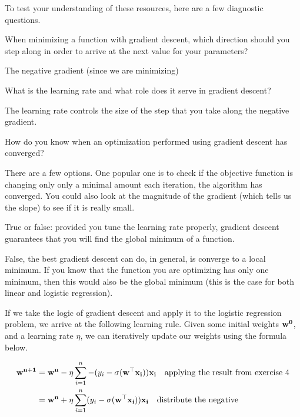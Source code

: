 \documentclass[assignment03_Solutions]{subfiles}
\begin{document}
\begin{exercise}[(10 minutes)]
To test your understanding of these resources, here are a few diagnostic questions.
\bes
\item When minimizing a function with gradient descent, which direction should you step along in order to arrive at the next value for your parameters?
\begin{boxedsolution}
The negative gradient (since we are minimizing)
\end{boxedsolution}

\item What is the learning rate and what role does it serve in gradient descent?
\begin{boxedsolution}
The learning rate controls the size of the step that you take along the negative gradient.
\end{boxedsolution}

\item How do you know when an optimization performed using gradient descent has converged?
\begin{boxedsolution}
There are a few options.  One popular one is to check if the objective function is changing only only a minimal amount each iteration, the algorithm has converged.  You could also look at the magnitude of the gradient (which tells us the slope) to see if it is really small.
\end{boxedsolution}

\item True or false: provided you tune the learning rate properly, gradient descent guarantees that you will find the global minimum of a function.
\begin{boxedsolution}
False, the best gradient descent can do, in general, is converge to a local minimum.  If you know that the function you are optimizing has only one minimum, then this would also be the global minimum (this is the case for both linear and logistic regression).
\end{boxedsolution}
\ees
\end{exercise}

If we take the logic of gradient descent and apply it to the logistic regression problem, we arrive at the following learning rule.  Given some initial weights $\mathbf{w^0}$, and a learning rate $\eta$, we can iteratively update our weights using the formula below.

\begin{align}
\mathbf{w^{n+1}} &= \mathbf{w^n} - \eta \sum_{i=1}^n  -(y_i - \sigma(\mathbf{w}^\top \mathbf{x_i})) \mathbf{x_i} ~~~\mbox{applying the result from exercise 4} \\
&=  \mathbf{w^n} + \eta \sum_{i=1}^n  (y_i - \sigma(\mathbf{w}^\top \mathbf{x_i})) \mathbf{x_i}  ~~~\mbox{distribute the negative}
\end{align}
\end{document}
